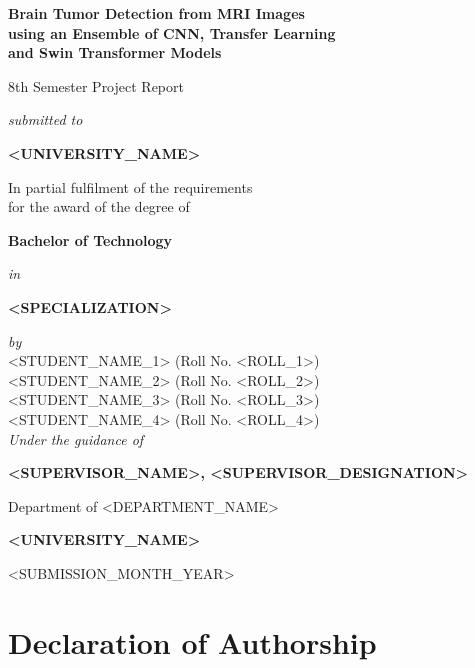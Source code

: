 \documentclass[12pt,a4paper,oneside]{report}
\begin{document}
\begin{titlepage}
  \centering
  \vspace*{2cm}
  {\LARGE\bfseries Brain Tumor Detection from MRI Images \\[6pt]
   using an Ensemble of CNN, Transfer Learning \\[6pt]
   and Swin Transformer Models\par}
  \vspace{2cm}
  {\large 8th Semester Project Report\par}
  \vspace{0.6cm}
  {\itshape submitted to\par}
  \vspace{0.4cm}
  {\Large\bfseries <UNIVERSITY\_NAME>\par}
  \vspace{1.0cm}
  In partial fulfilment of the requirements \\
  for the award of the degree of \\[8pt]
  {\large\bfseries Bachelor of Technology\par}
  \textit{in} \\[6pt]
  {\large\bfseries <SPECIALIZATION>\par}
  \vspace{1.0cm}
  \textit{by} \\[6pt]
  <STUDENT\_NAME\_1> (Roll No. <ROLL\_1>) \\[4pt]
  <STUDENT\_NAME\_2> (Roll No. <ROLL\_2>) \\[4pt]
  <STUDENT\_NAME\_3> (Roll No. <ROLL\_3>) \\[4pt]
  <STUDENT\_NAME\_4> (Roll No. <ROLL\_4>) \\
  \vspace{1.0cm}
  \textit{Under the guidance of} \\[6pt]
  {\bfseries <SUPERVISOR\_NAME>, <SUPERVISOR\_DESIGNATION>\par}
  \vspace{1.0cm}
  Department of <DEPARTMENT\_NAME> \\[6pt]
  {\bfseries <UNIVERSITY\_NAME>\par}
  \vspace{0.5cm}
  <SUBMISSION\_MONTH\_YEAR>
\end{titlepage}

\chapter*{Declaration of Authorship}
\end{document}
